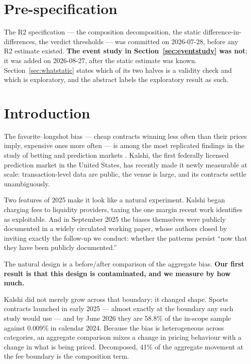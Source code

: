 \documentclass[preprint,12pt,authoryear]{elsarticle}
\begin{document}
\section*{Pre-specification}

The R2 specification --- the composition decomposition, the static
difference-in-differences, the verdict thresholds --- was committed on
2026-07-28, before any R2 estimate existed. \textbf{The event study in
Section~\ref{sec:eventstudy} was not}; it was added on 2026-08-27, after the
static estimate was known. Section~\ref{sec:whatstatic} states which of its two
halves is a validity check and which is exploratory, and the abstract labels the
exploratory result as such.

\section{Introduction}

The favorite--longshot bias --- cheap contracts winning less often than their
prices imply, expensive ones more often --- is among the most replicated
findings in the study of betting and prediction markets
\citep{thaler1988,ottaviani2008,snowberg2010}. Kalshi, the first federally
licensed prediction market in the United States, has recently made it newly
measurable at scale: transaction-level data are public, the venue is large, and
its contracts settle unambiguously.

Two features of 2025 make it look like a natural experiment. Kalshi began
charging fees to liquidity providers, taxing the one margin recent work
identifies as exploitable. And in September 2025 the biases themselves were
publicly documented in a widely circulated working paper, whose authors closed
by inviting exactly the follow-up we conduct: whether the patterns persist ``now
that they have been publicly documented.''

The natural design is a before/after comparison of the aggregate bias.
\textbf{Our first result is that this design is contaminated, and we measure by
how much.}

Kalshi did not merely grow across that boundary; it changed shape. Sports
contracts launched in early 2025 --- almost exactly at the boundary any such
study would use --- and by June 2026 they are 58.8\% of the in-scope sample
against 0.009\% in calendar 2024. Because the bias is heterogeneous across
categories, an aggregate comparison mixes a change in pricing behaviour with a
change in what is being priced. Decomposed, 41\% of the aggregate movement at
the fee boundary is the composition term.
\end{document}
